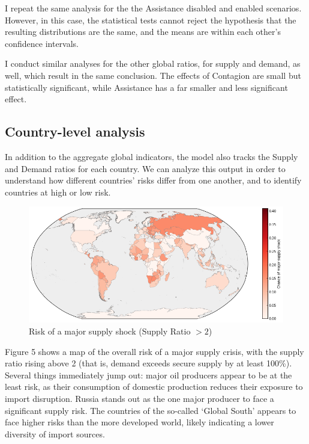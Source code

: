 \documentclass{article}
\begin{document}
I repeat the same analysis for the the Assistance disabled and enabled scenarios. However, in this case, the statistical tests cannot reject the hypothesis that the resulting distributions are the same, and the means are within each other's confidence intervals.

I conduct similar analyses for the other global ratios, for supply and demand, as well, which result in the same conclusion. The effects of Contagion are small but statistically significant, while Assistance has a far smaller and less significant effect.

\subsection{Country-level analysis}

In addition to the aggregate global indicators, the model also tracks the Supply and Demand ratios for each country. We can analyze this output in order to understand how different countries' risks differ from one another, and to identify countries at high or low risk.

\begin{figure}[h!]
	\centering
	\includegraphics[width=\textwidth]{../Graphics/SupplyShockMap}
	\caption{Risk of a major supply shock (Supply Ratio $>2$)}

\end{figure}

Figure 5 shows a map of the overall risk of a major supply crisis, with the supply ratio rising above 2 (that is, demand exceeds secure supply by at least 100\%). Several things immediately jump out: major oil producers appear to be at the least risk, as their consumption of domestic production reduces their exposure to import disruption. Russia stands out as the one major producer to face a significant supply risk. The countries of the so-called `Global South' appears to face higher risks than the more developed world, likely indicating a lower diversity of import sources.
\end{document}
